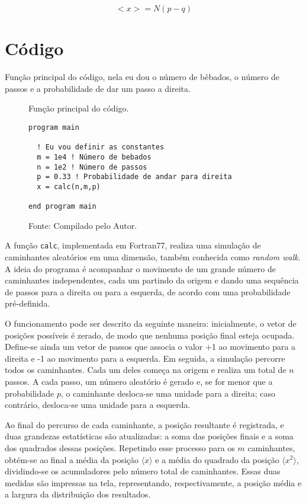 \begin{equation} \label{média}
    <x> = N(p - q)
\end{equation}

\section*{Código}

Função principal do código, nela eu dou o número de bêbados, o número de passos e a probabilidade de dar um passo a direita.

\vspace*{2\baselineskip}



\begin{figure}[h!]
\centering
\caption{Função principal do código.}
\centering
\begin{lstlisting}
program main

  ! Eu vou definir as constantes
  m = 1e4 ! Número de bebados
  n = 1e2 ! Número de passos
  p = 0.33 ! Probabilidade de andar para direita
  x = calc(n,m,p)

end program main
\end{lstlisting}

\caption*{Fonte: Compilado pelo Autor.}
\label{fig:função_principal do_código tarefa 2}
\end{figure}

A função \texttt{calc}, implementada em Fortran77, realiza uma simulação de 
caminhantes aleatórios em uma dimensão, também conhecida como \textit{random walk}. 
A ideia do programa é acompanhar o movimento de um grande número de caminhantes 
independentes, cada um partindo da origem e dando uma sequência de passos para 
a direita ou para a esquerda, de acordo com uma probabilidade pré-definida.

O funcionamento pode ser descrito da seguinte maneira: inicialmente, o vetor de 
posições possíveis é zerado, de modo que nenhuma posição final esteja ocupada. 
Define-se ainda um vetor de passos que associa o valor +1 ao movimento para a 
direita e -1 ao movimento para a esquerda. Em seguida, a simulação percorre todos 
os caminhantes. Cada um deles começa na origem e realiza um total de $n$ passos. 
A cada passo, um número aleatório é gerado e, se for menor que a probabilidade $p$, 
o caminhante desloca-se uma unidade para a direita; caso contrário, desloca-se 
uma unidade para a esquerda.

Ao final do percurso de cada caminhante, a posição resultante é registrada, e duas 
grandezas estatísticas são atualizadas: a soma das posições finais e a soma dos 
quadrados dessas posições. Repetindo esse processo para os $m$ caminhantes, obtém-se 
ao final a média da posição $\langle x \rangle$ e a média do quadrado da posição 
$\langle x^2 \rangle$, dividindo-se os acumuladores pelo número total de caminhantes. 
Essas duas medidas são impressas na tela, representando, respectivamente, a posição 
média e a largura da distribuição dos resultados.

